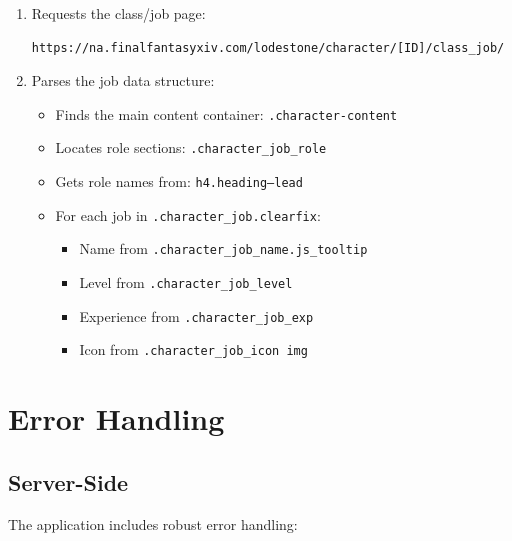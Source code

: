 \documentclass{article}
\begin{document}
\begin{enumerate}[label=\alph*)]
    \item Requests the class/job page:
    \begin{lstlisting}[language=text]
https://na.finalfantasyxiv.com/lodestone/character/[ID]/class_job/
    \end{lstlisting}
    \item Parses the job data structure:
    \begin{itemize}
        \item Finds the main content container: \texttt{.character-content}
        \item Locates role sections: \texttt{.character\_job\_role}
        \item Gets role names from: \texttt{h4.heading--lead}
        \item For each job in \texttt{.character\_job.clearfix}:
        \begin{itemize}
            \item Name from \texttt{.character\_job\_name.js\_tooltip}
            \item Level from \texttt{.character\_job\_level}
            \item Experience from \texttt{.character\_job\_exp}
            \item Icon from \texttt{.character\_job\_icon img}
        \end{itemize}
    \end{itemize}
\end{enumerate}

\section{Error Handling}

\subsection{Server-Side}
The application includes robust error handling:
\end{document}
